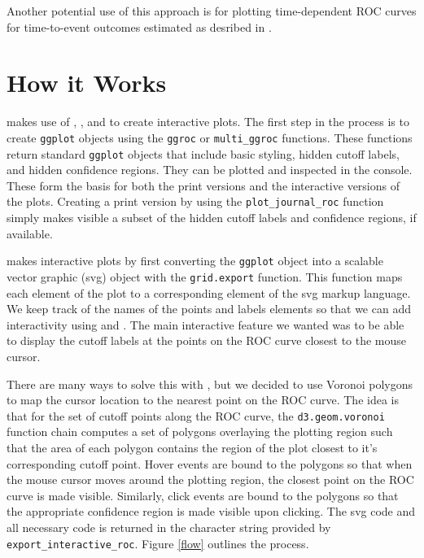 \documentclass[article]{jss}
\begin{document}
Another potential use of this approach is for plotting time-dependent
ROC curves for time-to-event outcomes estimated as desribed in
\citep{heagerty2000time}.

\section{How it Works}\label{how-it-works}

 makes use of  \citep{ggplot2}, 
\citep{gridsvg}, and  \citep{bostock2011d3} to create
interactive plots. The first step in the process is to create
\texttt{ggplot} objects using the \texttt{ggroc} or
\texttt{multi\_ggroc} functions. These functions return standard
\texttt{ggplot} objects that include basic styling, hidden cutoff
labels, and hidden confidence regions. They can be plotted and inspected
in the  console. These form the basis for both the print
versions and the interactive versions of the plots. Creating a print
version by using the \texttt{plot\_journal\_roc} function simply makes
visible a subset of the hidden cutoff labels and confidence regions, if
available.

 makes interactive plots by first converting the
\texttt{ggplot} object into a scalable vector graphic (svg) object with
the \texttt{grid.export} function. This function maps each element of
the plot to a corresponding element of the svg markup language. We keep
track of the names of the points and labels elements so that we can add
interactivity using  and . The main
interactive feature we wanted was to be able to display the cutoff
labels at the points on the ROC curve closest to the mouse cursor.

There are many ways to solve this with , but we decided to
use Voronoi polygons to map the cursor location to the nearest point on
the ROC curve. The idea is that for the set of cutoff points along the
ROC curve, the \texttt{d3.geom.voronoi} function chain computes a set of
polygons overlaying the plotting region such that the area of each
polygon contains the region of the plot closest to it's corresponding
cutoff point. Hover events are bound to the polygons so that when the
mouse cursor moves around the plotting region, the closest point on the
ROC curve is made visible. Similarly, click events are bound to the
polygons so that the appropriate confidence region is made visible upon
clicking. The svg code and all necessary  code is
returned in the character string provided by
\texttt{export\_interactive\_roc}. Figure \ref{flow} outlines the
 process.
\end{document}

